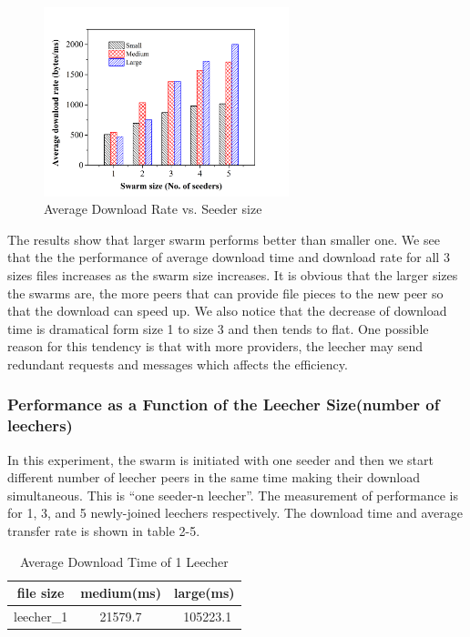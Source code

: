 \documentclass[conference]{IEEEtran}
\begin{document}
\begin{figure}
	\centering
	\includegraphics[width=2.8in]{Graph2.png}
	\caption{Average Download Rate vs. Seeder size}
	\label{fig:side:a}
\end{figure}

	The results show that larger swarm performs better than smaller one. We see that the the performance of average download time and download rate for all 3 sizes files increases as the swarm size increases. It is obvious that the larger sizes the swarms are, the more peers that can provide file pieces to the new peer so that the download can speed up. We also notice that the decrease of download time is dramatical form size 1 to size 3 and then tends to flat. One possible reason for this tendency is that with more providers, the leecher may send redundant requests and messages which affects the efficiency.	
	
	\subsubsection{Performance as a Function of the Leecher Size(number of leechers)}
	In this experiment, the swarm is initiated with one seeder and then we start different number of leecher peers in the same time making their download simultaneous. This is ``one seeder-n leecher''. The measurement of performance is for 1, 3, and 5 newly-joined leechers respectively. The download time and average transfer rate is shown in table 2-5.
		\begin{table}
			\caption{Average Download Time of 1 Leecher}
			\begin{center}
				\begin{tabular}{ccc}
					\hline
					\rule{0pt}{12pt}file size  & \rule{0pt}{12pt}medium(ms) & \rule{0pt}{12pt}large(ms)\\
					\hline\rule{0pt}{12pt}
					 leecher\_1   &    21579.7 
					    & \   105223.1  \\
					\hline
				\end{tabular}
			\end{center}
		\end{table}
		
\end{document}
